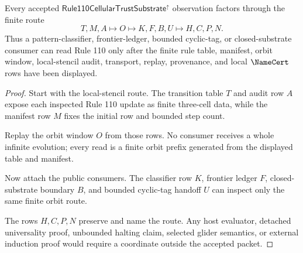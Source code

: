 \begin{theorem}
\label{thm:rule110-cellular-trust-substrate-observation-boundary}
Every accepted $\mathsf{Rule110CellularTrustSubstrate}^{\uparrow}$ observation factors through the finite route
$$
T,M,A \longmapsto O \longmapsto K,F,B,U \longmapsto H,C,P,N .
$$
Thus a pattern-classifier, frontier-ledger, bounded cyclic-tag, or closed-substrate consumer can read Rule 110 only after the finite rule table, manifest, orbit window, local-stencil audit, transport, replay, provenance, and local $\NameCert$ rows have been displayed.
\end{theorem}
\begin{proof}
Start with the local-stencil route. The transition table $T$ and audit row $A$ expose each inspected Rule 110 update as finite three-cell data, while the manifest row $M$ fixes the initial row and bounded step count.

Replay the orbit window $O$ from those rows. No consumer receives a whole infinite evolution; every read is a finite orbit prefix generated from the displayed table and manifest.

Now attach the public consumers. The classifier row $K$, frontier ledger $F$, closed-substrate boundary $B$, and bounded cyclic-tag handoff $U$ can inspect only the same finite orbit route.

The rows $H,C,P,N$ preserve and name the route. Any host evaluator, detached universality proof, unbounded halting claim, selected glider semantics, or external induction proof would require a coordinate outside the accepted packet.
\end{proof}



